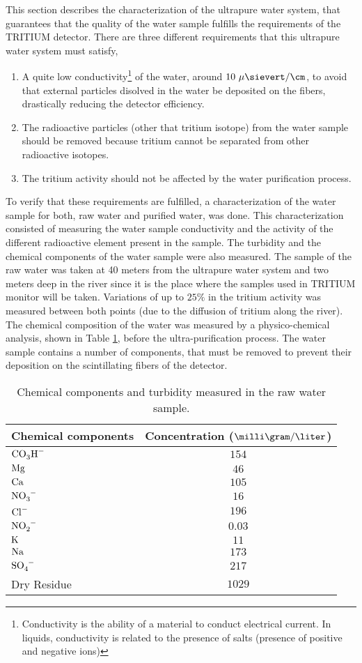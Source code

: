 This section describes the characterization of the ultrapure water system, that guarantees that the quality of the water sample fulfills the requirements of the TRITIUM detector. There are three different requirements that this ultrapure water system must satisfy,

\begin{enumerate}
\item{} A quite low conductivity\footnote{Conductivity is the ability of a material to conduct electrical current. In liquids, conductivity is related to the presence of salts (presence of positive and negative ions)} of the water, around $10~\mu\sievert/\cm$, to avoid that external particles disolved in the water be deposited on the fibers, drastically reducing the detector efficiency.

\item{} The radioactive particles (other that tritium isotope) from the water sample should be removed because tritium cannot be separated from other radioactive isotopes.

\item{} The tritium activity should not be affected by the water purification process. 

\end{enumerate}

To verify that these requirements are fulfilled, a characterization of the water sample for both, raw water and purified water, was done. This characterization consisted of measuring the water sample conductivity and the activity of the different radioactive element present in the sample. The turbidity and the chemical components of the water sample were also measured. The sample of the raw water was taken at 40 meters from the ultrapure water system and two meters deep in the river since it is the place where the samples used in TRITIUM monitor will be taken. Variations of up to $25\%$ in the tritium activity was measured between both points (due to the diffusion of tritium along the river). The chemical composition of the water was measured by a physico-chemical analysis, shown in Table \ref{tab:ChemicalComponentsRawWater}, before the ultra-purification process. The water sample contains a number of components, that must be removed to prevent their deposition on the scintillating fibers of the detector.


\begin{table}[htbp]
\centering{}%
\begin{tabular}{lc}
\toprule 
Chemical components & Concentration ($\milli\gram/\liter$) \tabularnewline
\midrule
\midrule 
$\ce{CO_{3}H^-}$ & $154$ \tabularnewline
$\ce{Mg}$ & $46$ \tabularnewline
$\ce{Ca}$ & $105$ \tabularnewline
$\ce{NO_{3}^-}$ & $16$ \tabularnewline
$\ce{Cl^-}$ & $196$ \tabularnewline
$\ce{NO_{2}^-}$ & $0.03$ \tabularnewline
$\ce{K}$ & $11$ \tabularnewline
$\ce{Na}$ & $173$ \tabularnewline
$\ce{SO_{4}^-}$ & $217$ \tabularnewline
Dry Residue & $1029$ \tabularnewline
\bottomrule
\end{tabular}
\caption{Chemical components and turbidity measured in the raw water sample.}
\label{tab:ChemicalComponentsRawWater}
\end{table}

